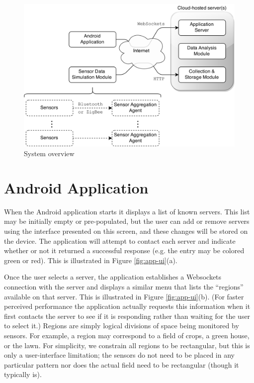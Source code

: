 \documentclass{article}
\begin{document}
\begin{figure}[htb]
\begin{center}
   \includegraphics[width=1\linewidth]{Images/module-relationships.png}
\end{center}
\vspace{-0.2in}
   \caption{System overview}
   \label{fig:module-relationships}
\end{figure}

\section{Android Application}
When the Android application starts it displays a list of known servers.
This list may be initially empty or pre-populated, but the user can add or remove servers
using the interface presented on this screen, and these changes will be stored on the device.
The application will attempt to contact each server and indicate whether or not it returned a successful response (e.g. the entry may be colored green or red).
This is illustrated in Figure \ref{fig:app-ui}(a).

Once the user selects a server, the application establishes a Websockets connection
with the server and displays a similar menu that lists
the ``regions'' available on that server.
This is illustrated in Figure \ref{fig:app-ui}(b).
(For faster perceived performance the application actually requests this information when it
first contacts the server to see if it is responding rather than waiting for the user to select it.)
Regions are simply logical divisions of space being monitored by sensors.
For example, a region may correspond to a field of crops, a green house, or the lawn. 
For simplicity, we constrain all regions to be rectangular, but this is only
a user-interface limitation; the sensors do not need to be placed in any particular pattern 
nor does the actual field need to be rectangular (though it typically is).
\end{document}

